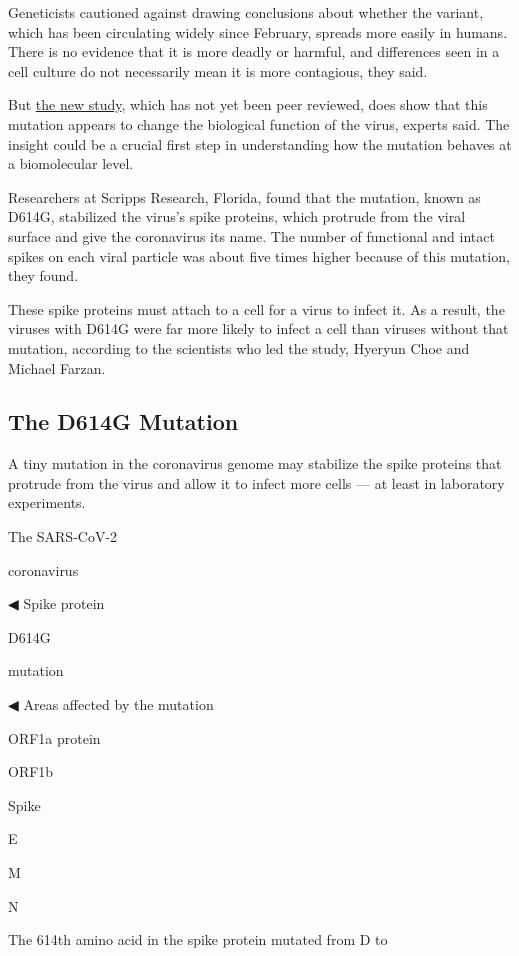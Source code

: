 Geneticists cautioned against drawing conclusions about whether the
variant, which has been circulating widely since February, spreads more
easily in humans. There is no evidence that it is more deadly or
harmful, and differences seen in a cell culture do not necessarily mean
it is more contagious, they said.

But
\href{https://www.scripps.edu/news-and-events/press-room/2020/20200612-choe-farzan-coronavirus-spike-mutation.html}{the
new study}, which has not yet been peer reviewed, does show that this
mutation appears to change the biological function of the virus, experts
said. The insight could be a crucial first step in understanding how the
mutation behaves at a biomolecular level.

Researchers at Scripps Research, Florida, found that the mutation, known
as D614G, stabilized the virus's spike proteins, which protrude from the
viral surface and give the coronavirus its name. The number of
functional and intact spikes on each viral particle was about five times
higher because of this mutation, they found.

These spike proteins must attach to a cell for a virus to infect it. As
a result, the viruses with D614G were far more likely to infect a cell
than viruses without that mutation, according to the scientists who led
the study, Hyeryun Choe and Michael Farzan.

\hypertarget{the-d614g-mutation}{%
\subsection{The D614G Mutation}\label{the-d614g-mutation}}

A tiny mutation in the coronavirus genome may stabilize the spike
proteins that protrude from the virus and allow it to infect more cells
--- at least in laboratory experiments.

The SARS-CoV-2

coronavirus

◀ Spike protein

D614G

mutation

◀ Areas affected by the mutation

ORF1a protein

ORF1b

Spike

E

M

N

The 614th amino acid in the spike protein mutated from D to

